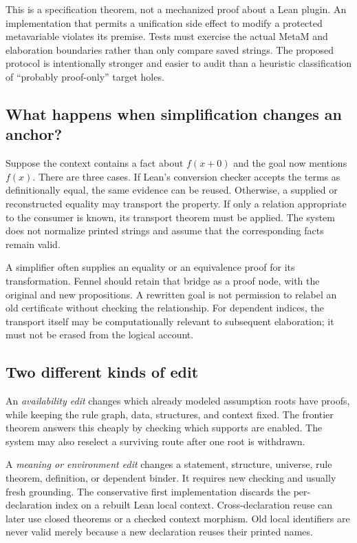 \documentclass[11pt,a4paper]{article}
\theoremstyle{definition}
\theoremstyle{remark}
\begin{document}
This is a specification theorem, not a mechanized proof about a Lean plugin.
An implementation that permits a unification side effect to modify a protected
metavariable violates its premise. Tests must exercise the actual MetaM and
elaboration boundaries rather than only compare saved strings. The proposed
protocol is intentionally stronger and easier to audit than a heuristic
classification of ``probably proof-only'' target holes.

\subsection{What happens when simplification changes an anchor?}
Suppose the context contains a fact about $f(x+0)$ and the goal now mentions
$f(x)$. There are three cases. If Lean's conversion checker accepts the terms
as definitionally equal, the same evidence can be reused. Otherwise, a supplied
or reconstructed equality may transport the property. If only a relation
appropriate to the consumer is known, its transport theorem must be applied.
The system does not normalize printed strings and assume that the corresponding
facts remain valid.

A simplifier often supplies an equality or an equivalence proof for its
transformation. Fennel should retain that bridge as a proof node, with the
original and new propositions. A rewritten goal is not permission to relabel
an old certificate without checking the relationship. For dependent indices,
the transport itself may be computationally relevant to subsequent elaboration;
it must not be erased from the logical account.

\subsection{Two different kinds of edit}
An \emph{availability edit} changes which already modeled assumption roots have
proofs, while keeping the rule graph, data, structures, and context fixed. The
frontier theorem answers this cheaply by checking which supports are enabled.
The system may also reselect a surviving route after one root is withdrawn.

A \emph{meaning or environment edit} changes a statement, structure, universe,
rule theorem, definition, or dependent binder. It requires new checking and
usually fresh grounding. The conservative first implementation discards the
per-declaration index on a rebuilt Lean local context. Cross-declaration reuse
can later use closed theorems or a checked context morphism. Old local
identifiers are never valid merely because a new declaration reuses their
printed names.
\end{document}
